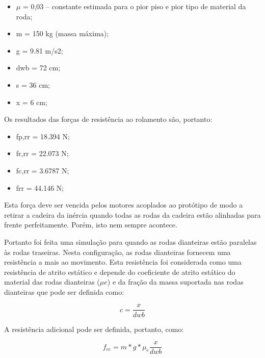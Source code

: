 \begin{itemize}
\item $\mu$ = 0,03 \cite{rolling_resistance} – constante estimada para o pior piso e pior tipo de material da roda;

\item m = 150 kg (massa máxima);

\item g = 9.81 m/s2;

\item dwb = 72 cm;

\item s = 36 cm;

\item x = 6 cm;

\end{itemize}

Os resultados das forças de resistência ao rolamento são, portanto:

\begin{itemize}
\item fp,rr = 18.394 N;

\item fr,rr = 22.073 N;

\item fc,rr = 3.6787 N;

\item frr = 44.146 N;

\end{itemize}

Esta força deve ser vencida pelos motores acoplados ao protótipo de modo a retirar a cadeira da inércia quando todas as rodas da cadeira estão alinhadas para frente perfeitamente. Porém, isto nem sempre acontece.

Portanto foi feita uma simulação para quando as rodas dianteiras estão paralelas às rodas traseiras. Nesta configuração, as rodas dianteiras fornecem uma resistência a mais ao movimento. Esta resistência foi considerada como uma resistência de atrito estático e depende do coeficiente de atrito estático do material das rodas dianteiras ($\mu e$) e da fração da massa suportada nas rodas dianteiras que pode ser definida como:

\begin{equation}
c = \frac{x}{dwb}
\end{equation}

A resistência adicional pode ser definida, portanto, como:

\begin{equation}
f_{ce}= m*g* \mu_e \frac{x}{dwb}
\end{equation}

